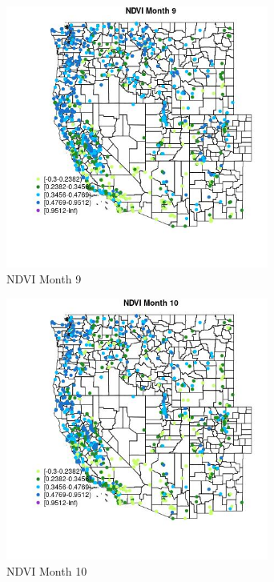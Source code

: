 \begin{figure} 
\centering  
\includegraphics[width=0.77\textwidth]{Code_Outputs/Report_ML_input_PM25_Step4_part_f_de_duplicated_aves_prioritize_24hr_obswNAs_MapObsMo9NDVI.jpg} 
\caption{\label{fig:Report_ML_input_PM25_Step4_part_f_de_duplicated_aves_prioritize_24hr_obswNAsMapObsMo9NDVI}NDVI Month 9} 
\end{figure} 
 

\begin{figure} 
\centering  
\includegraphics[width=0.77\textwidth]{Code_Outputs/Report_ML_input_PM25_Step4_part_f_de_duplicated_aves_prioritize_24hr_obswNAs_MapObsMo10NDVI.jpg} 
\caption{\label{fig:Report_ML_input_PM25_Step4_part_f_de_duplicated_aves_prioritize_24hr_obswNAsMapObsMo10NDVI}NDVI Month 10} 
\end{figure} 
 

